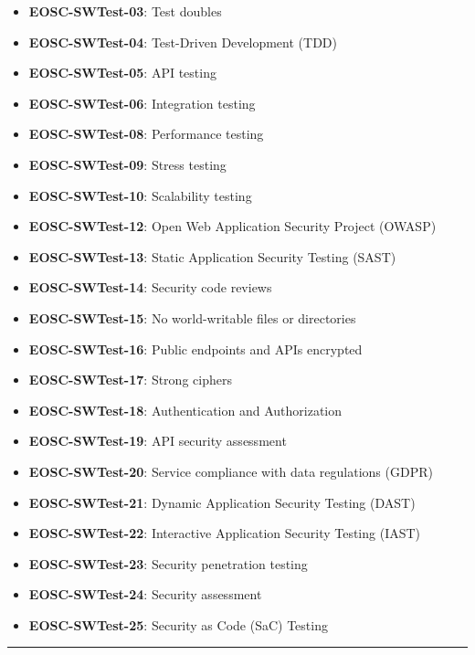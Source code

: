 \begin{itemize}
    \item \textbf{EOSC-SWTest-03}: Test doubles
    \item \textbf{EOSC-SWTest-04}: Test-Driven Development (TDD)
    \item \textbf{EOSC-SWTest-05}: API testing
    \item \textbf{EOSC-SWTest-06}: Integration testing
    \item \textbf{EOSC-SWTest-08}: Performance testing
    \item \textbf{EOSC-SWTest-09}: Stress testing
    \item \textbf{EOSC-SWTest-10}: Scalability testing
    \item \textbf{EOSC-SWTest-12}: Open Web Application Security Project (OWASP)
    \item \textbf{EOSC-SWTest-13}: Static Application Security Testing (SAST)
    \item \textbf{EOSC-SWTest-14}: Security code reviews
    \item \textbf{EOSC-SWTest-15}: No world-writable files or directories
    \item \textbf{EOSC-SWTest-16}: Public endpoints and APIs encrypted
    \item \textbf{EOSC-SWTest-17}: Strong ciphers
    \item \textbf{EOSC-SWTest-18}: Authentication and Authorization
    \item \textbf{EOSC-SWTest-19}: API security assessment
    \item \textbf{EOSC-SWTest-20}: Service compliance with data regulations (GDPR)
    \item \textbf{EOSC-SWTest-21}: Dynamic Application Security Testing (DAST)
    \item \textbf{EOSC-SWTest-22}: Interactive Application Security Testing (IAST)
    \item \textbf{EOSC-SWTest-23}: Security penetration testing
    \item \textbf{EOSC-SWTest-24}: Security assessment
    \item \textbf{EOSC-SWTest-25}: Security as Code (SaC) Testing
\end{itemize}
\hrule

